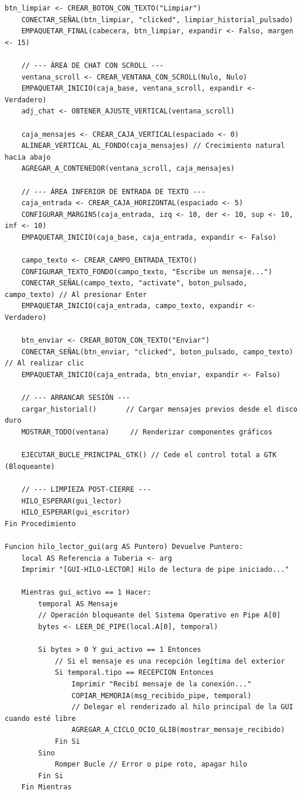 \begin{lstlisting}[style=estiloPseudo]
    btn_limpiar <- CREAR_BOTON_CON_TEXTO("Limpiar")
    CONECTAR_SEÑAL(btn_limpiar, "clicked", limpiar_historial_pulsado)
    EMPAQUETAR_FINAL(cabecera, btn_limpiar, expandir <- Falso, margen <- 15)

    // --- ÁREA DE CHAT CON SCROLL ---
    ventana_scroll <- CREAR_VENTANA_CON_SCROLL(Nulo, Nulo)
    EMPAQUETAR_INICIO(caja_base, ventana_scroll, expandir <- Verdadero)
    adj_chat <- OBTENER_AJUSTE_VERTICAL(ventana_scroll)

    caja_mensajes <- CREAR_CAJA_VERTICAL(espaciado <- 0)
    ALINEAR_VERTICAL_AL_FONDO(caja_mensajes) // Crecimiento natural hacia abajo
    AGREGAR_A_CONTENEDOR(ventana_scroll, caja_mensajes)

    // --- ÁREA INFERIOR DE ENTRADA DE TEXTO ---
    caja_entrada <- CREAR_CAJA_HORIZONTAL(espaciado <- 5)
    CONFIGURAR_MARGINS(caja_entrada, izq <- 10, der <- 10, sup <- 10, inf <- 10)
    EMPAQUETAR_INICIO(caja_base, caja_entrada, expandir <- Falso)

    campo_texto <- CREAR_CAMPO_ENTRADA_TEXTO()
    CONFIGURAR_TEXTO_FONDO(campo_texto, "Escribe un mensaje...")
    CONECTAR_SEÑAL(campo_texto, "activate", boton_pulsado, campo_texto) // Al presionar Enter
    EMPAQUETAR_INICIO(caja_entrada, campo_texto, expandir <- Verdadero)

    btn_enviar <- CREAR_BOTON_CON_TEXTO("Enviar")
    CONECTAR_SEÑAL(btn_enviar, "clicked", boton_pulsado, campo_texto) // Al realizar clic
    EMPAQUETAR_INICIO(caja_entrada, btn_enviar, expandir <- Falso)

    // --- ARRANCAR SESIÓN ---
    cargar_historial()       // Cargar mensajes previos desde el disco duro
    MOSTRAR_TODO(ventana)     // Renderizar componentes gráficos
    
    EJECUTAR_BUCLE_PRINCIPAL_GTK() // Cede el control total a GTK (Bloqueante)

    // --- LIMPIEZA POST-CIERRE ---
    HILO_ESPERAR(gui_lector)
    HILO_ESPERAR(gui_escritor)
Fin Procedimiento

Funcion hilo_lector_gui(arg AS Puntero) Devuelve Puntero:
    local AS Referencia a Tuberia <- arg
    Imprimir "[GUI-HILO-LECTOR] Hilo de lectura de pipe iniciado..."

    Mientras gui_activo == 1 Hacer:
        temporal AS Mensaje
        // Operación bloqueante del Sistema Operativo en Pipe A[0]
        bytes <- LEER_DE_PIPE(local.A[0], temporal)

        Si bytes > 0 Y gui_activo == 1 Entonces
            // Si el mensaje es una recepción legítima del exterior
            Si temporal.tipo == RECEPCION Entonces
                Imprimir "Recibí mensaje de la conexión..."
                COPIAR_MEMORIA(msg_recibido_pipe, temporal)
                // Delegar el renderizado al hilo principal de la GUI cuando esté libre
                AGREGAR_A_CICLO_OCIO_GLIB(mostrar_mensaje_recibido)
            Fin Si
        Sino
            Romper Bucle // Error o pipe roto, apagar hilo
        Fin Si
    Fin Mientras


\end{lstlisting}

